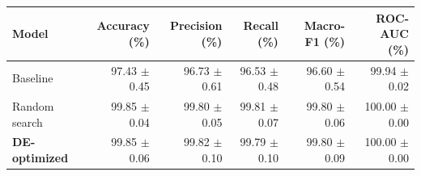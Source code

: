 \begin{tabular}{lrrrrr}
\toprule
Model & Accuracy (\%) & Precision (\%) & Recall (\%) & Macro-F1 (\%) & ROC-AUC (\%) \\
\midrule
Baseline & \shortstack{97.43\\$\pm$ 0.45} & \shortstack{96.73\\$\pm$ 0.61} & \shortstack{96.53\\$\pm$ 0.48} & \shortstack{96.60\\$\pm$ 0.54} & \shortstack{99.94\\$\pm$ 0.02} \\
Random search & \shortstack{99.85\\$\pm$ 0.04} & \shortstack{99.80\\$\pm$ 0.05} & \shortstack{99.81\\$\pm$ 0.07} & \shortstack{99.80\\$\pm$ 0.06} & \shortstack{100.00\\$\pm$ 0.00} \\
\textbf{DE-optimized} & \shortstack{99.85\\$\pm$ 0.06} & \shortstack{99.82\\$\pm$ 0.10} & \shortstack{99.79\\$\pm$ 0.10} & \shortstack{99.80\\$\pm$ 0.09} & \shortstack{100.00\\$\pm$ 0.00} \\
\bottomrule
\end{tabular}
